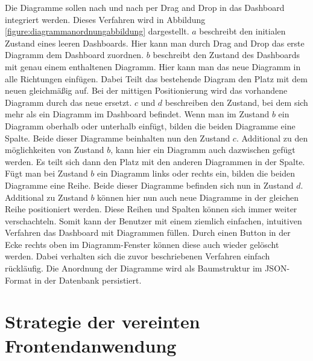 Die Diagramme sollen nach und nach per Drag and Drop in das Dashboard integriert werden. Dieses Verfahren
wird in Abbildung \ref{figure:diagrammanordnungabbildung} dargestellt. \(a\) beschreibt den
initialen Zustand eines leeren Dashboards. Hier kann man durch Drag and Drop das erste Diagramm dem Dashboard
zuordnen. \(b\) beschreibt den Zustand des Dashboards mit genau einem enthaltenen Diagramm. Hier kann man das
neue Diagramm in alle Richtungen einfügen. Dabei Teilt das bestehende Diagram den Platz mit dem neuen gleichmäßig
auf. Bei der mittigen Positionierung wird das vorhandene Diagramm durch das neue ersetzt. \(c\) und \(d\)
beschreiben den Zustand, bei dem sich mehr als ein Diagramm im Dashboard befindet. Wenn man im Zustand \(b\)
ein Diagramm oberhalb oder unterhalb einfügt, bilden die beiden Diagramme eine Spalte. Beide dieser Diagramme
beinhalten nun den Zustand \(c\). Additional zu den möglichkeiten von Zustand \(b\), kann hier ein Diagramm
auch dazwischen gefügt werden. Es teilt sich dann den Platz mit den anderen Diagrammen in der Spalte.
Fügt man bei Zustand \(b\) ein Diagramm links oder rechts ein, bilden die beiden Diagramme eine Reihe.
Beide dieser Diagramme befinden sich nun in Zustand \(d\). Additional zu Zustand \(b\) können hier nun
auch neue Diagramme in der gleichen Reihe positioniert werden. Diese Reihen und Spalten können sich
immer weiter verschachteln. Somit kann der Benutzer mit einem ziemlich einfachen, intuitiven Verfahren
das Dashboard mit Diagrammen füllen. Durch einen Button in der Ecke rechts oben im Diagramm-Fenster
können diese auch wieder gelöscht werden. Dabei verhalten sich die zuvor beschriebenen Verfahren einfach rückläufig.
Die Anordnung der Diagramme wird als Baumstruktur im JSON-Format in der Datenbank persistiert.

\section{Strategie der vereinten Frontendanwendung}
\label{sec:vereintefrontendanwendung}
